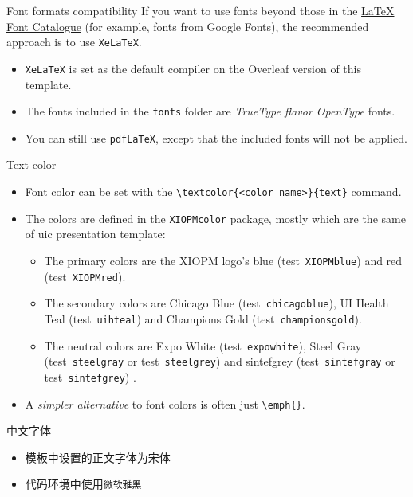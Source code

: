 \documentclass{beamer}
\newcommand{\hrefcol}[2]{\textcolor{uihteal}{\href{#1}{#2}}}
\newcommand{\testcolor}[1]{\colorbox{#1}{\textcolor{#1}{test}}~\texttt{#1}}
\begin{document}
\begin{frame}[fragile]{Font formats compatibility}
If you want to use fonts beyond those in the \hrefcol{https://tug.org/FontCatalogue/}{LaTeX Font Catalogue} (for example, fonts from Google Fonts), the recommended approach is to use \verb|XeLaTeX|.
\begin{itemize}
\item \verb|XeLaTeX| is set as the default compiler on the Overleaf version of this template.
\item The fonts included in the \verb|fonts| folder are \emph{TrueType flavor OpenType} fonts.
\item You can still use \verb|pdfLaTeX|, except that the included fonts will not be applied.
\end{itemize}
\end{frame}

\begin{frame}[fragile]{Text color}
\begin{itemize}
\item Font color can be set with the \verb|\textcolor{<color name>}{text}| command.
\item The colors are defined in the \texttt{XIOPMcolor} package, mostly which are the same of uic presentation template:
  \begin{itemize}
  \item The primary colors are the XIOPM logo's blue (\testcolor{XIOPMblue}) and red (\testcolor{XIOPMred}).
  \item The secondary colors are Chicago Blue (\testcolor{chicagoblue}), UI Health Teal (\testcolor{uihteal}) and Champions Gold (\testcolor{championsgold}).
  \item The neutral colors are Expo White (\testcolor{expowhite}), Steel Gray (\testcolor{steelgray} or \testcolor{steelgrey}) and sintefgrey (\testcolor{sintefgray} or \testcolor{sintefgrey}) .
  \end{itemize} 
\item A \emph{simpler alternative} to font colors is often just \verb|\emph{}|.
\end{itemize}
\end{frame}

\begin{frame}[fragile]{中文字体}
\begin{itemize}
\item 模板中设置的正文字体为宋体
\item 代码环境中使用\verb|微软雅黑|
\end{itemize}
\end{frame}
\end{document}
